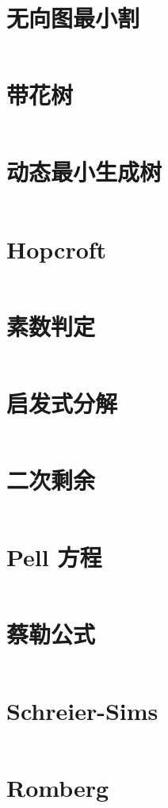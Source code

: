 \documentclass[titlepage,landscape,a4paper,10pt]{article}
\begin{document}
\begin{multicols}{2}
\begin{spacing}{0.8}
\section{无向图最小割}
\inputminted{cpp}{src/无向图最小割.cpp}

\section{带花树}
\inputminted{cpp}{src/带花树.cpp}

\section{动态最小生成树}
\inputminted{cpp}{src/动态最小生成树.cpp}

\section{Hopcroft}
\inputminted{cpp}{src/Hopcroft.cpp}

\section{素数判定}
\inputminted{cpp}{src/素数判定.cpp}

\section{启发式分解}
\inputminted{cpp}{src/启发式分解.cpp}

\section{二次剩余}
\inputminted{cpp}{src/二次剩余.cpp}

\section{Pell 方程}
\inputminted{cpp}{src/Pell方程.cpp}

\section{蔡勒公式}
\inputminted{cpp}{src/蔡勒公式.cpp}

\section{Schreier-Sims}
\inputminted{cpp}{improve/SchreierSims.cpp}

\section{Romberg}
\inputminted{cpp}{src/Romberg.cpp}


\end{spacing}
\end{multicols}
\end{document}
